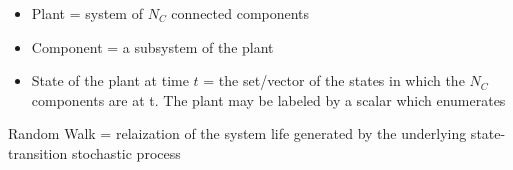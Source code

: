 \documentclass[8pt, landscape, fleqn]{scrartcl}
\begin{document}
\begin{multicols*}{3}
\begin{itemize}
\item Plant = system of $N_C$ connected components
\item Component = a subsystem of the plant
\item State of the plant at time $t$ = the set/vector of the states in which the $N_C$ components are at t. The plant may be labeled by a scalar which enumerates 
\end{itemize}    

Random Walk = relaization of the system life generated by the underlying state-transition stochastic process


\end{multicols*}
\end{document}
